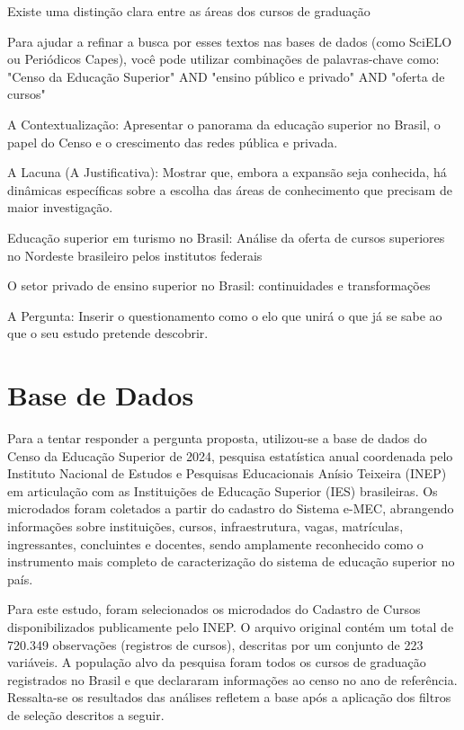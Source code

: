 \documentclass[12pt]{article}
\begin{document}
Existe uma distinção clara entre as áreas dos cursos de graduação

Para ajudar a refinar a busca por esses textos nas bases de dados (como SciELO ou Periódicos Capes), você pode utilizar combinações de palavras-chave como: "Censo da Educação Superior" AND "ensino público e privado" AND "oferta de cursos"

A Contextualização: Apresentar o panorama da educação superior no Brasil, o papel do Censo e o crescimento das redes pública e privada.

A Lacuna (A Justificativa): Mostrar que, embora a expansão seja conhecida, há dinâmicas específicas sobre a escolha das áreas de conhecimento que precisam de maior investigação.

Educação superior em turismo no Brasil: Análise da oferta de
cursos superiores no Nordeste brasileiro pelos institutos
federais

O setor privado de
ensino superior no
Brasil: continuidades
e transformações

A Pergunta: Inserir o questionamento como o elo que unirá o que já se sabe ao que o seu estudo pretende descobrir.

\section{Base de Dados}

Para a tentar responder a pergunta proposta, utilizou-se a base de dados do Censo da Educação Superior de 2024, pesquisa estatística anual coordenada pelo Instituto Nacional de Estudos e Pesquisas Educacionais Anísio Teixeira (INEP) em articulação com as Instituições de Educação Superior (IES) brasileiras. Os microdados foram coletados a partir do cadastro do Sistema e-MEC, abrangendo informações sobre instituições, cursos, infraestrutura, vagas, matrículas, ingressantes, concluintes e docentes, sendo amplamente reconhecido como o instrumento mais completo de caracterização do sistema de educação superior no país.

Para este estudo, foram selecionados os microdados do Cadastro de Cursos disponibilizados publicamente pelo INEP. O arquivo original contém um total de 720.349 observações (registros de cursos), descritas por um conjunto de 223 variáveis. A população alvo da pesquisa foram todos os cursos de graduação registrados no Brasil e que declararam informações ao censo no ano de referência. Ressalta-se os resultados das análises refletem a base após a aplicação dos filtros de seleção descritos a seguir.
\end{document}
